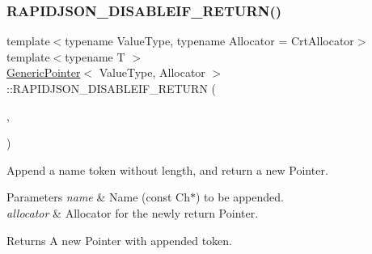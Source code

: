 \subsubsection{\texorpdfstring{R\+A\+P\+I\+D\+J\+S\+O\+N\+\_\+\+D\+I\+S\+A\+B\+L\+E\+I\+F\+\_\+\+R\+E\+T\+U\+R\+N()}{RAPIDJSON\_DISABLEIF\_RETURN()}\hspace{0.1cm}{\footnotesize\ttfamily [1/3]}}
{\footnotesize\ttfamily template$<$typename Value\+Type, typename Allocator = Crt\+Allocator$>$ \\
template$<$typename T $>$ \\
\hyperlink{a02232}{Generic\+Pointer}$<$ Value\+Type, Allocator $>$\+::R\+A\+P\+I\+D\+J\+S\+O\+N\+\_\+\+D\+I\+S\+A\+B\+L\+E\+I\+F\+\_\+\+R\+E\+T\+U\+RN (\begin{DoxyParamCaption}\item[{(internal\+::\+Not\+Expr$<$ internal\+::\+Is\+Same$<$ typename internal\+::\+Remove\+Const$<$ T $>$\+::\hyperlink{a00560_a1d1cfd8ffb84e947f82999c682b666a7}{Type}, \hyperlink{a02232_ab292356c11b4015c98d21b966b11f285}{Ch} $>$ $>$)}]{,  }\item[{(\hyperlink{a02232}{Generic\+Pointer}$<$ Value\+Type, Allocator $>$)}]{ }\end{DoxyParamCaption})}



Append a name token without length, and return a new Pointer. 


\begin{DoxyParams}{Parameters}
{\em name} & Name (const Ch$\ast$) to be appended. \\
\hline
{\em allocator} & Allocator for the newly return Pointer. \\
\hline
\end{DoxyParams}
\begin{DoxyReturn}{Returns}
A new Pointer with appended token. 
\end{DoxyReturn}
\mbox{\label{a02232_a914bbdd96e2a248e035b8ebd68526369}} 
